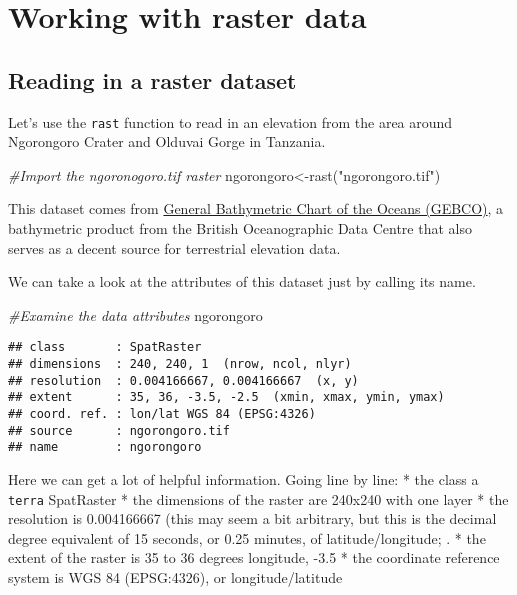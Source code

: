 \documentclass[
]{book}
\newenvironment{Shaded}{\begin{snugshade}}{\end{snugshade}}
\newcommand{\CommentTok}[1]{\textcolor[rgb]{0.56,0.35,0.01}{\textit{#1}}}
\newcommand{\FunctionTok}[1]{\textcolor[rgb]{0.00,0.00,0.00}{#1}}
\newcommand{\NormalTok}[1]{#1}
\newcommand{\OtherTok}[1]{\textcolor[rgb]{0.56,0.35,0.01}{#1}}
\newcommand{\StringTok}[1]{\textcolor[rgb]{0.31,0.60,0.02}{#1}}
\begin{document}
\hypertarget{working-with-raster-data}{%
\chapter{Working with raster data}\label{working-with-raster-data}}

\hypertarget{reading-in-a-raster-dataset}{%
\section{Reading in a raster dataset}\label{reading-in-a-raster-dataset}}

Let's use the \texttt{rast} function to read in an elevation from the area around Ngorongoro Crater and Olduvai Gorge in Tanzania.

\begin{Shaded}
\begin{Highlighting}[]
\CommentTok{\#Import the ngoronogoro.tif raster }
\NormalTok{ngorongoro}\OtherTok{\textless{}{-}}\FunctionTok{rast}\NormalTok{(}\StringTok{"ngorongoro.tif"}\NormalTok{)}
\end{Highlighting}
\end{Shaded}

This dataset comes from \href{https://www.gebco.net/}{General Bathymetric Chart of the Oceans (GEBCO)}, a bathymetric product from the British Oceanographic Data Centre that also serves as a decent source for terrestrial elevation data.

We can take a look at the attributes of this dataset just by calling its name.

\begin{Shaded}
\begin{Highlighting}[]
\CommentTok{\#Examine the data attributes}
\NormalTok{ngorongoro}
\end{Highlighting}
\end{Shaded}

\begin{verbatim}
## class       : SpatRaster 
## dimensions  : 240, 240, 1  (nrow, ncol, nlyr)
## resolution  : 0.004166667, 0.004166667  (x, y)
## extent      : 35, 36, -3.5, -2.5  (xmin, xmax, ymin, ymax)
## coord. ref. : lon/lat WGS 84 (EPSG:4326) 
## source      : ngorongoro.tif 
## name        : ngorongoro
\end{verbatim}

Here we can get a lot of helpful information. Going line by line:
* the class a \texttt{terra} SpatRaster
* the dimensions of the raster are 240x240 with one layer
* the resolution is 0.004166667 (this may seem a bit arbitrary, but this is the decimal degree equivalent of 15 seconds, or 0.25 minutes, of latitude/longitude; .
* the extent of the raster is 35 to 36 degrees longitude, -3.5
* the coordinate reference system is WGS 84 (EPSG:4326), or longitude/latitude
\end{document}
